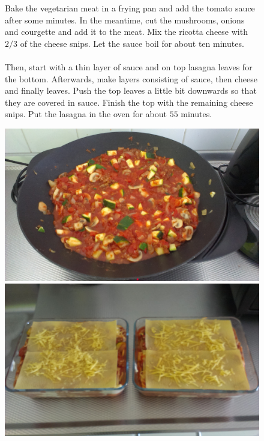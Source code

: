 \documentclass[a4paper,12pt]{report}
\begin{document}
\begin{figure}[h]

\begin{minipage}{0.6\textwidth}
Bake the vegetarian meat in a frying pan and add the tomato sauce after some minutes. In the meantime, cut the mushrooms, onions and courgette and add it to the meat. Mix the ricotta cheese with $2/3$ of the cheese snips.  Let the sauce boil for about ten minutes.\\ \\
Then, start with a thin layer of sauce and on top lasagna leaves for the bottom. Afterwards, make layers consisting of sauce, then cheese and finally leaves. Push the top leaves a little bit downwards so that they are covered in sauce. Finish the top with the remaining cheese snips. Put the lasagna in the oven for about $55$ minutes. 
\end{minipage}
\begin{minipage}{0.35\textwidth}
	\includegraphics[scale=0.065]{Images/lasag.jpg}
	\includegraphics[scale=0.065]{Images/lasagna.jpg}
\end{minipage}
\end{figure}
\end{document}
